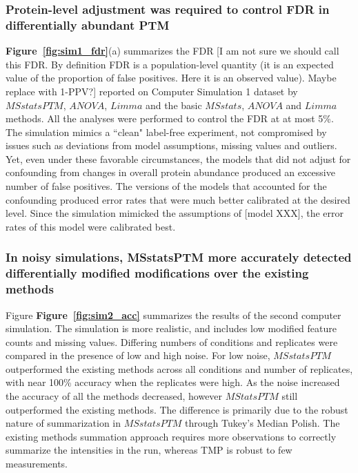 \documentclass[mcp]{article}
\numberwithin{table}{section}
\def\todo#1{{\color{red}[#1]}}
\def\figref#1{{\bf Figure~\ref{fig:#1}}}
\begin{document}
\subsubsection*{Protein-level adjustment was required to control FDR in differentially abundant PTM}

\figref{sim1_fdr}(a) summarizes the FDR \todo{I am not sure we should call this FDR. By definition FDR is a population-level quantity (it is an expected value of the proportion of false positives. Here it is an observed value). Maybe replace with 1-PPV?} reported on Computer Simulation 1 dataset by $MSstatsPTM$, $ANOVA$, $Limma$ and the basic $MSstats$, $ANOVA$ and $Limma$ methods. All the analyses were performed to control the FDR at at most 5\%.  The  simulation mimics a ``clean" label-free experiment, not compromised by issues such as deviations from model assumptions, missing values and outliers. Yet, even under these favorable circumstances, the models that did not adjust for confounding from changes in overall protein abundance produced an excessive number of false positives. The versions of the models that accounted for the confounding produced error rates that were much better calibrated at the desired level. Since the simulation mimicked the assumptions of \todo{model XXX}, the error rates of this model were calibrated best.



\subsubsection*{In noisy simulations, MSstatsPTM more accurately detected differentially modified modifications over the existing methods}

Figure \figref{sim2_acc} summarizes the results of the second computer simulation. The simulation is more realistic, and includes low modified feature counts and missing values. Differing numbers of conditions and replicates were compared in the presence of low and high noise. For low noise, $MSstatsPTM$ outperformed the existing methods across all conditions and number of replicates, with near 100\% accuracy when the replicates were high. As the noise increased the accuracy of all the methods decreased, however $MStatsPTM$ still outperformed the existing methods. The difference is primarily due to the robust nature of summarization in $MSstatsPTM$ through Tukey's Median Polish. The existing methods summation approach requires more observations to correctly summarize the intensities in the run, whereas TMP is robust to few measurements.
\end{document}
